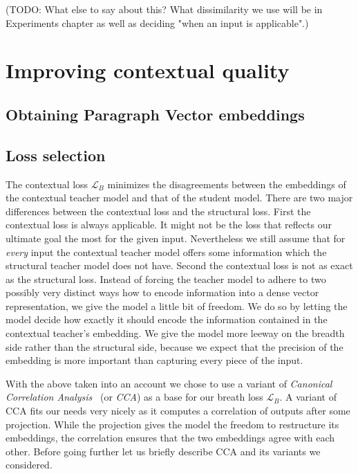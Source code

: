 (TODO: What else to say about this? What dissimilarity we use will be in
Experiments chapter as well as deciding "when an input is applicable".)


\section{Improving contextual quality}

\subsection{Obtaining Paragraph Vector embeddings}

\subsection{Loss selection}

The contextual loss $\mathcal{L}_B$ minimizes the disagreements between the
embeddings of the contextual teacher model  and that of the student model.
There are two major differences between the contextual loss and the structural
loss. First the contextual loss is always applicable. It might not be the loss
that reflects our ultimate goal the most for the given input. Nevertheless we
still assume that for \emph{every} input the contextual teacher model offers
some information which the structural teacher model does not have. Second the
contextual loss is not as exact as the structural loss. Instead of forcing the
teacher model to adhere to two possibly very distinct ways how to encode
information into a dense vector representation, we give the model a little bit
of freedom. We do so by letting the model decide how exactly it should encode
the information contained in the contextual teacher's embedding. We give the
model more leeway on the breadth side rather than the structural side, because
we expect that the precision of the embedding is more important than capturing
every piece of the input.

With the above taken into an account we chose to use a variant of
\emph{Canonical Correlation Analysis}~\cite{hotelling1992relations} (or
\emph{CCA}) as a base for our breath loss $\mathcal{L}_B$. A variant of CCA fits
our needs very nicely as it computes a correlation of outputs after some
projection. While the projection gives the model the freedom to restructure its
embeddings, the correlation ensures that the two embeddings agree with each
other. Before going further let us briefly describe CCA and its variants we
considered.

